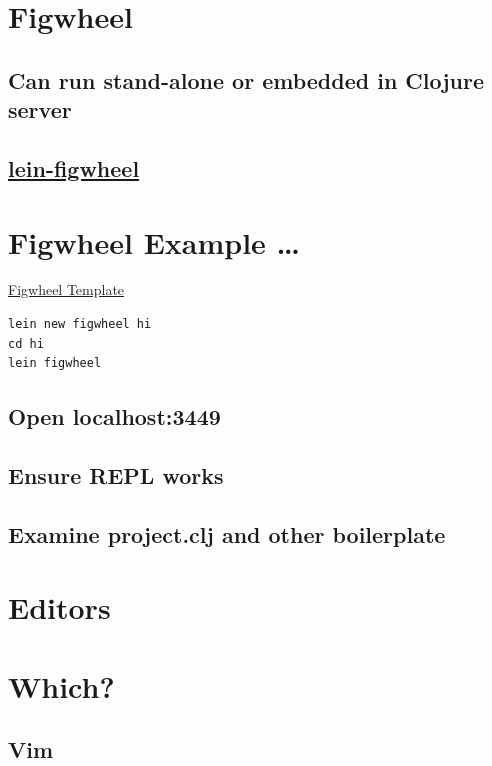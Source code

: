 \documentclass[11pt]{article}
\begin{document}
\section{Figwheel}
\label{sec:orgheadline16}
\subsection{Can run stand-alone or embedded in Clojure server}
\label{sec:orgheadline14}
\subsection{\href{https://github.com/bhauman/lein-figwheel}{lein-figwheel}}
\label{sec:orgheadline15}

\section{Figwheel Example \ldots{}}
\label{sec:orgheadline20}
\href{https://github.com/bhauman/figwheel-template}{Figwheel Template}
\begin{verbatim}
lein new figwheel hi
cd hi
lein figwheel
\end{verbatim}

\subsection{Open localhost:3449}
\label{sec:orgheadline17}
\subsection{Ensure REPL works}
\label{sec:orgheadline18}
\subsection{Examine project.clj and other boilerplate}
\label{sec:orgheadline19}

\section{Editors}
\label{sec:orgheadline21}

\section{Which?}
\label{sec:orgheadline28}
\subsection{Vim}
\label{sec:orgheadline22}
\end{document}
